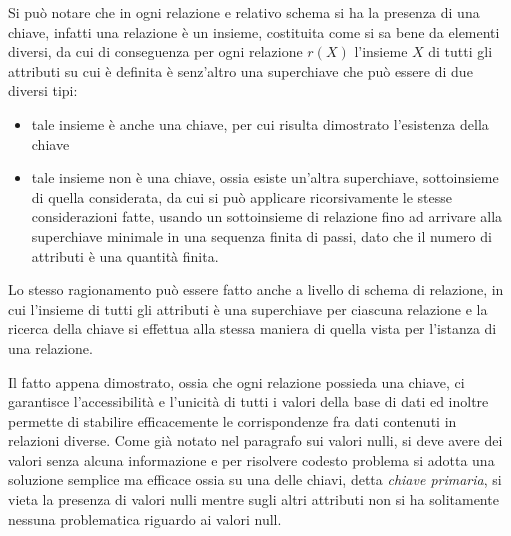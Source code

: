 \documentclass[a4paper,12pt, oneside]{book}
\begin{document}
\begin{itemize}
\begin{enumerate}
                Si può notare che in ogni relazione e relativo schema si ha la presenza di una chiave, infatti
                una relazione è un insieme, costituita come si sa bene da elementi diversi, da cui di
                conseguenza per ogni relazione $r(X)$ l'insieme $X$ di tutti gli attributi su cui è definita è
                senz'altro una superchiave che può essere di due diversi tipi:
                \begin{itemize}
                    \item tale insieme è anche una chiave, per cui risulta dimostrato l'esistenza della chiave
                    \item tale insieme non è una chiave, ossia esiste un'altra superchiave, sottoinsieme di
                        quella considerata, da cui si può applicare ricorsivamente le stesse considerazioni
                        fatte, usando un sottoinsieme di relazione fino ad arrivare alla superchiave minimale
                        in una sequenza finita di passi, dato che il numero di attributi è una quantità finita.
                \end{itemize}
                Lo stesso ragionamento può essere fatto anche a livello di schema di relazione, in cui
                l'insieme di tutti gli attributi è una superchiave per ciascuna relazione e la ricerca della
                chiave si effettua alla stessa maniera di quella vista per l'istanza di una relazione.

                Il fatto appena dimostrato, ossia che ogni relazione possieda una chiave, ci garantisce
                l'accessibilità e l'unicità di tutti i valori della base di dati ed inoltre permette di
                stabilire efficacemente le corrispondenze fra dati contenuti in relazioni diverse.\newline
                Come già notato nel paragrafo sui valori nulli, si deve avere dei valori senza alcuna
                informazione e per risolvere codesto problema si adotta una soluzione semplice ma efficace
                ossia su una delle chiavi, detta \emph{chiave primaria}, si vieta la presenza di valori nulli
                mentre sugli altri attributi non si ha solitamente nessuna problematica riguardo ai valori null.


\end{enumerate}
\end{itemize}
\end{document}

